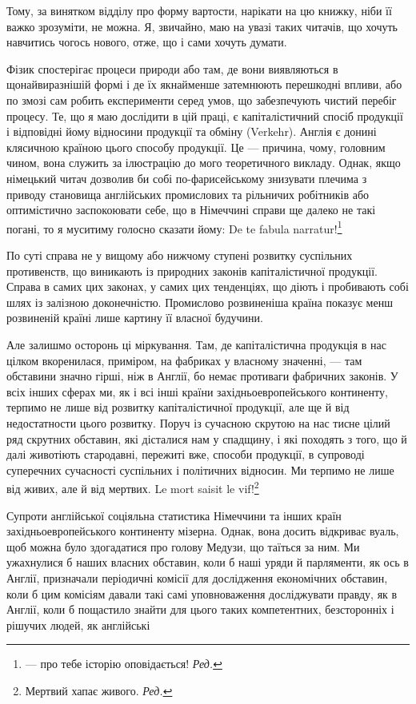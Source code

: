 
Тому, за винятком відділу про форму вартости, нарікати на цю
книжку, ніби її важко зрозуміти, не можна. Я, звичайно, маю
на увазі таких читачів, що хочуть навчитись чогось нового, отже,
що і сами хочуть думати.

Фізик спостерігає процеси природи або там, де вони виявляються
в щонайвиразнішій формі і де їх якнайменше затемнюють
перешкодні впливи, або по змозі сам робить експерименти серед
умов, що забезпечують чистий перебіг процесу. Те, що я маю
дослідити в цій праці, є капіталістичний спосіб продукції і відповідні
йому відносини продукції та обміну (Verkehr). Англія
є донині клясичною країною цього способу продукції. Це —
причина, чому, головним чином, вона служить за ілюстрацію
до мого теоретичного викладу. Однак, якщо німецький читач
дозволив би собі по-фарисейському знизувати плечима з приводу
становища англійських промислових та рільничих робітників або
оптимістично заспокоювати себе, що в Німеччині справи ще далеко
не такі погані, то я муситиму голосно сказати йому: De
te fabula narratur!\footnote*{
— про тебе історію оповідається! \emph{Ред.}
}

По суті справа не у вищому або нижчому ступені розвитку
суспільних противенств, що виникають із природних законів капіталістичної
продукції. Справа в самих цих законах, у самих цих
тенденціях, що діють і пробивають собі шлях із залізною доконечністю.
Промислово розвиненіша країна показує менш розвиненій
країні лише картину її власної будучини.

Але залишмо осторонь ці міркування. Там, де капіталістична
продукція в нас цілком вкоренилася, приміром, на фабриках
у власному значенні, — там обставини значно гірші, ніж в Англії,
бо немає противаги фабричних законів. У всіх інших сферах ми,
як і всі інші країни західньоевропейського континенту, терпимо
не лише від розвитку капіталістичної продукції, але ще й від
недостатности цього розвитку. Поруч із сучасною скрутою на
нас тисне цілий ряд скрутних обставин, які дісталися нам у
спадщину, і які походять з того, що й далі животіють стародавні,
пережиті вже, способи продукції, в супроводі суперечних
сучасності суспільних і політичних відносин. Ми терпимо
не лише від живих, але й від мертвих. Le mort saisit le vif!\footnote*{
Мертвий хапає живого. \emph{Ред.}
}

Супроти англійської соціяльна статистика Німеччини та інших
країн західньоевропейського континенту мізерна. Однак, вона
досить відкриває вуаль, щоб можна було здогадатися про голову
Медузи, що таїться за ним. Ми ужахнулися б наших власних
обставин, коли б наші уряди й парляменти, як ось в Англії, призначали
періодичні комісії для дослідження економічних обставин,
коли б цим комісіям давали такі самі уповноваження досліджувати
правду, як в Англії, коли б пощастило знайти для цього
таких компетентних, безсторонніх і рішучих людей, як англійські
\parbreak{}  %
